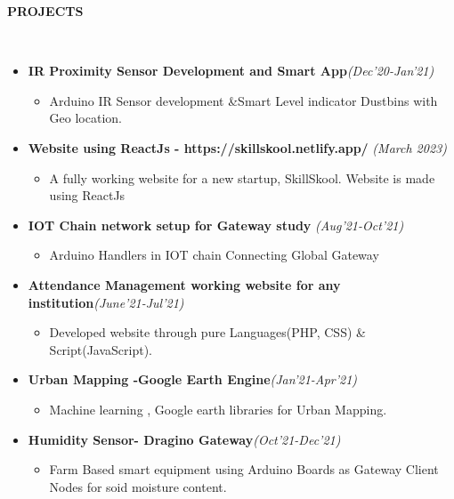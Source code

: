 \documentclass[a4paper,10pt]{article}
\newcommand{\resheading}[1]{{\small \colorbox{mygrey}{\begin{minipage}{0.99\textwidth}{\textbf{#1 \vphantom{p\^{E}}}}\end{minipage}}}}
\begin{document}
\noindent
\resheading{\textbf{PROJECTS} }\\[-0.3cm]
\begin{itemize}
\item \textbf{IR Proximity Sensor Development and Smart App}\hfill \emph{(Dec'20-Jan'21)} 
\begin{itemize}
    \item Arduino IR Sensor development \&Smart Level indicator Dustbins with Geo location.
\end{itemize}
\item \textbf{Website using ReactJs - https://skillskool.netlify.app/ }\hfill \emph{(March 2023)}
\begin{itemize}
    \item A fully working website for a new startup, SkillSkool. Website is made using ReactJs
\end{itemize}

\item \textbf{IOT Chain network setup for Gateway study}
\hfill \emph{(Aug’21-Oct'21)}
\begin{itemize}
    \item Arduino Handlers in IOT chain Connecting Global Gateway
\end{itemize}
    
\item \textbf{Attendance Management working website for any institution}\hfill \emph{(June’21-Jul'21)} 
\begin{itemize}
    \item Developed website through pure Languages(PHP, CSS) \& Script(JavaScript).
\end{itemize}

\item \textbf{Urban Mapping -Google Earth Engine}\hfill \emph{(Jan'21-Apr'21)}
\begin{itemize}
    \item Machine learning , Google earth libraries for Urban Mapping.
\end{itemize}

\item \textbf{Humidity Sensor- Dragino Gateway}\hfill \emph{(Oct'21-Dec'21)}
\begin{itemize}
    \item Farm Based smart equipment using Arduino Boards as Gateway Client Nodes for soid moisture content.
\end{itemize}

\end{itemize}
\end{document}
